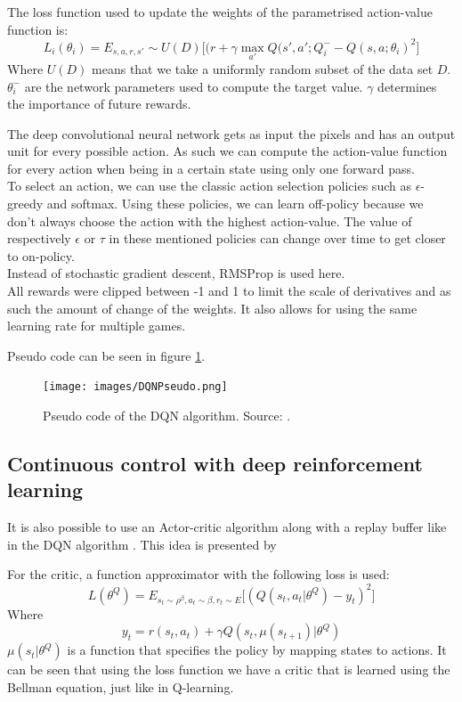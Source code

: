 \documentclass[a4paper]{article}
\begin{document}
The loss function used to update the weights of the parametrised action-value function is:
\begin{equation}
L_i(\theta_i) = E_{s,a,r,s'} \sim U(D) \big [ (r + \gamma \max_{a'} Q(s',a'; Q^{-}_i - Q(s,a;\theta_i)^2 \big ]
\end{equation}
Where $U(D)$ means that we take a uniformly random subset of the data set $D$. $\theta^{-}_i$ are the network parameters used to compute the target value. $\gamma$ determines the importance of future rewards.

The deep convolutional neural network gets as input the pixels and has an output unit for every possible action. As such we can compute the action-value function for every action when being in a certain state using only one forward pass.\\

To select an action, we can use the classic action selection policies such as $\epsilon$-greedy and softmax. Using these policies, we can learn off-policy because we don't always choose the action with the highest action-value. The value of respectively $\epsilon$ or $\tau$ in these mentioned policies can change over time to get closer to on-policy.\\
Instead of stochastic gradient descent, RMSProp is used here.\\

All rewards were clipped between -1 and 1 to limit the scale of derivatives and as such the amount of change of the weights. It also allows for using the same learning rate for multiple games.

Pseudo code can be seen in figure \ref{fig:dqnpseudo}.
\begin{figure}[H]
\texttt{[image: images/DQNPseudo.png]}
\caption{Pseudo code of the DQN algorithm. Source: \cite{mnih2013playing}.}
\label{fig:dqnpseudo}
\end{figure}

\subsection{Continuous control with deep reinforcement learning}
It is also possible to use an Actor-critic algorithm along with a replay buffer like in the DQN algorithm \citep{Mnih2015Human-levelLearning}. This idea is presented by \cite{Lillicrap2015ContinuousLearning}

For the critic, a function approximator with the following loss is used:
\begin{equation}
L(\theta^Q) = E_{s_t \sim \rho^{\beta}, a_t \sim \beta, r_t \sim E} \big [ (Q(s_t, a_t \vert \theta^Q) - y_t)^2 \big ]
\end{equation}
Where
\begin{equation}
y_t = r(s_t,a_t) + \gamma Q(s_t, \mu(s_{t+1}) \vert \theta^Q)
\end{equation}
$\mu(s_t \vert \theta^Q)$ is a function that specifies the policy by mapping states to actions.
It can be seen that using the loss function we have a critic that is learned using the Bellman equation, just like in Q-learning.\\
\end{document}

